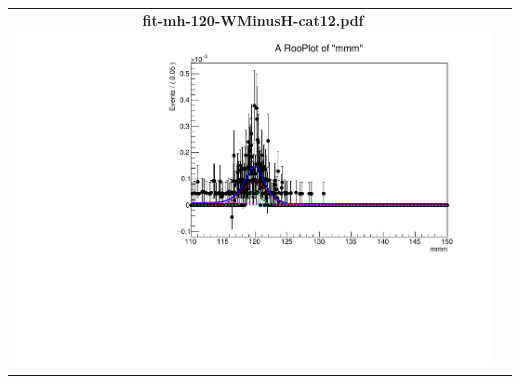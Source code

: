 \begin{longtable}{|c|c|}
{}
 \\
\hline
\parbox{0.49\textwidth}{
\centering
{\bfseries fit-mh-120-WMinusH-cat12.pdf}
\includegraphics[width=.49\textwidth]{figures/signal_model/AppendixBdt/WMinusH/120/fit_mh_120_WMinusH_cat12.pdf}
}
 & \\ \hline
\end{longtable}
